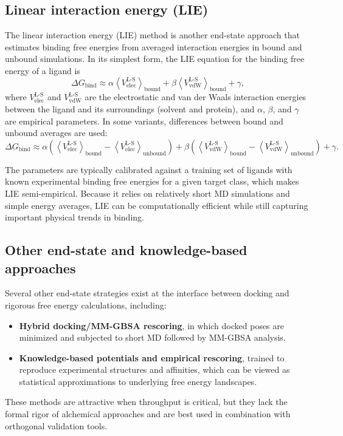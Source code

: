 \documentclass[12pt]{article}
\begin{document}
\subsection{Linear interaction energy (LIE)}

The linear interaction energy (LIE) method is another end-state approach that estimates binding free energies from averaged interaction energies in bound and unbound simulations.\cite{CH10_hansson1998lie} 
In its simplest form, the LIE equation for the binding free energy of a ligand is
\[
\Delta G_\mathrm{bind} \approx 
\alpha \left\langle V_\mathrm{elec}^{\mathrm{L\mbox{-}S}} \right\rangle_\mathrm{bound}
+ \beta \left\langle V_\mathrm{vdW}^{\mathrm{L\mbox{-}S}} \right\rangle_\mathrm{bound}
+ \gamma,
\]
where \(V_\mathrm{elec}^{\mathrm{L\mbox{-}S}}\) and \(V_\mathrm{vdW}^{\mathrm{L\mbox{-}S}}\) are the electrostatic and van der Waals interaction energies between the ligand and its surroundings (solvent and protein), and \(\alpha\), \(\beta\), and \(\gamma\) are empirical parameters. 
In some variants, differences between bound and unbound averages are used:
\[
\Delta G_\mathrm{bind} \approx 
\alpha \left( \left\langle V_\mathrm{elec}^{\mathrm{L\mbox{-}S}} \right\rangle_\mathrm{bound}
- \left\langle V_\mathrm{elec}^{\mathrm{L\mbox{-}S}} \right\rangle_\mathrm{unbound} \right)
+ \beta \left( \left\langle V_\mathrm{vdW}^{\mathrm{L\mbox{-}S}} \right\rangle_\mathrm{bound}
- \left\langle V_\mathrm{vdW}^{\mathrm{L\mbox{-}S}} \right\rangle_\mathrm{unbound} \right)
+ \gamma.
\]

The parameters are typically calibrated against a training set of ligands with known experimental binding free energies for a given target class, which makes LIE semi-empirical. 
Because it relies on relatively short MD simulations and simple energy averages, LIE can be computationally efficient while still capturing important physical trends in binding.\cite{CH10_hansson1998lie} 

\subsection{Other end-state and knowledge-based approaches}

Several other end-state strategies exist at the interface between docking and rigorous free energy calculations, including:
\begin{itemize}
  \item \textbf{Hybrid docking/MM-GBSA rescoring}, in which docked poses are minimized and subjected to short MD followed by MM-GBSA analysis.\cite{CH10_hou2011endpointhou} 
  \item \textbf{Knowledge-based potentials and empirical rescoring}, trained to reproduce experimental structures and affinities, which can be viewed as statistical approximations to underlying free energy landscapes.\cite{CH10_gohlke2000knowledge} 
\end{itemize}
These methods are attractive when throughput is critical, but they lack the formal rigor of alchemical approaches and are best used in combination with orthogonal validation tools. 
\end{document}
